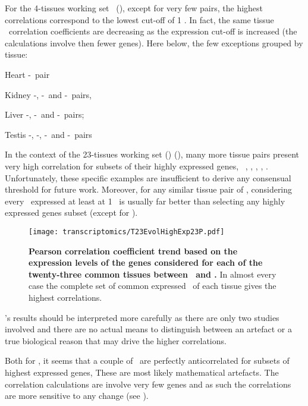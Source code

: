 For the 4-tissues working set \setOne\ (),
except for very few pairs, the highest correlations correspond to
the lowest cut-off of 1 \FPKM\@.
In fact, the same tissue \trep\ correlation coefficients
are decreasing as the expression cut-off is increased
(the calculations involve then fewer genes).
Here below, the few exceptions grouped by tissue:
\begin{eqlist}
\item[Heart] \uhlen{}-\gtex\ pair
\item[Kidney] \uhlen{}-\gtex, \castle{}-\uhlen\ and \castle{}-\gtex\ pairs,
\item[Liver]  \vt{}-\ibm, \ibm{}-\uhlen\ and \ibm{}-\uhlen\ pairs;
\item[Testis] \ibm{}-\uhlen, \vt{}-\gtex, \vt{}-\uhlen\ and \uhlen{}-\gtex\ pairs
\end{eqlist}

In the context of the 23-tissues working set (\setTwo) (),
many more tissue pairs present very high correlation for subsets of their highly
expressed genes, \ie\ \skeletal, \Thyroid, \Cortex, \Uterus, \Kidney.
Unfortunately, these specific examples are insufficient
to derive any consensual threshold for future work.
Moreover,
for any similar tissue pair of \setTwo,
considering every \pcg\ expressed at least at 1 \FPKM\ is usually
far better than selecting any highly expressed genes subset
(except for \kidney).

\begin{figure}[!htpb]
    \texttt{[image: transcriptomics/T23EvolHighExp23P.pdf]}\centering
    \caption[Pearson correlation coefficient trend based on the expression
    levels of the genes considered for each of the 23 common tissues]{%
\label{fig:CorHighExp23T}\textbf{Pearson correlation coefficient trend based
on the expression levels of the genes considered
for each of the twenty-three common tissues between \uhlen\ and \gtex.}
In almost every case the complete set of common expressed \pcgs\ of each tissue gives
the highest correlations.}
\end{figure}

\setTwo{}'s results should be interpreted more carefully as
there are only two studies involved and
there are no actual means to distinguish
between an artefact or a true biological reason
that may drive the higher correlations.

Both for ,
it seems that a couple of \treps\ are perfectly anticorrelated
for subsets of highest expressed genes,
These are most likely mathematical artefacts.
The correlation calculations are involve very few genes
and as such the correlations are more sensitive to any change
(see ).

